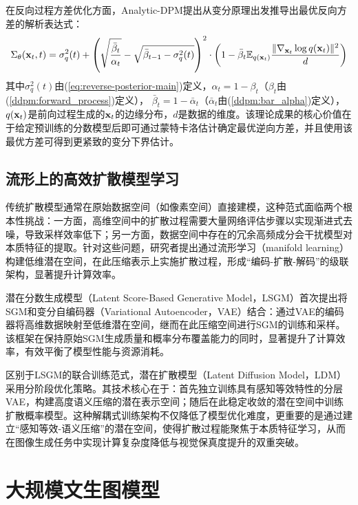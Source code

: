 \documentclass[11pt,a4paper,UTF8]{ctexart}
\begin{document}
在反向过程方差优化方面，Analytic-DPM\cite{bao2021analytic}提出从变分原理出发推导出最优反向方差的解析表达式：
\begin{equation*}
    \Sigma_\theta(\mathbf{x}_t,t)=\sigma_q^2(t) + \left(\sqrt{\frac{\bar{\beta}_t}{\alpha_t}} -\sqrt{\bar{\beta}_{t-1}-\sigma_q^2(t)} \right)^2\cdot \left(1-\bar{\beta}_t \mathbb{E}_{q(\mathbf{x}_t)}\frac{\|\nabla_{\mathbf{x}_t}\log q(\mathbf{x}_t) \|^2}{d} \right)
\end{equation*}
其中$\sigma_q^2(t)$由(\ref{eq:reverse-posterior-main})定义，$\alpha_t=1-\beta_t$（$\beta_t$由(\ref{ddpm:forward_process})定义），
$\bar{\beta}_t=1-\bar{\alpha}_t$（$\bar{\alpha}_t$由(\ref{ddpm:bar_alpha})定义），$q(\mathbf{x}_t)$是前向过程生成的$\mathbf{x}_t$的边缘分布，$d$是数据的维度。该理论成果的核心价值在于给定预训练的分数模型后即可通过蒙特卡洛估计确定最优逆向方差，并且使用该最优方差可得到更紧致的变分下界估计。


\subsection{流形上的高效扩散模型学习}

传统扩散模型通常在原始数据空间（如像素空间）直接建模，这种范式面临两个根本性挑战：一方面，高维空间中的扩散过程需要大量网络评估步骤以实现渐进式去噪，导致采样效率低下；另一方面，数据空间中存在的冗余高频成分会干扰模型对本质特征的提取。针对这些问题，研究者提出通过流形学习（manifold learning）构建低维潜在空间，在此压缩表示上实施扩散过程，形成“编码-扩散-解码”的级联架构，显著提升计算效率。

潜在分数生成模型（Latent Score-Based Generative Model，LSGM）\cite{vahdat2021score}首次提出将SGM和变分自编码器（Variational Autoencoder，VAE）结合：通过VAE的编码器将高维数据映射至低维潜在空间，继而在此压缩空间进行SGM的训练和采样。该框架在保持原始SGM生成质量和概率分布覆盖能力的同时，显著提升了计算效率，有效平衡了模型性能与资源消耗。

区别于LSGM的联合训练范式，潜在扩散模型（Latent Diffusion Model，LDM）\cite{rombach2022high}采用分阶段优化策略。其技术核心在于：首先独立训练具有感知等效特性的分层VAE，构建高度语义压缩的潜在表示空间；随后在此稳定收敛的潜在空间中训练扩散概率模型。这种解耦式训练架构不仅降低了模型优化难度，更重要的是通过建立“感知等效-语义压缩”的潜在空间，使得扩散过程能聚焦于本质特征学习，从而在图像生成任务中实现计算复杂度降低与视觉保真度提升的双重突破。

\newpage

\section{大规模文生图模型}
\end{document}
